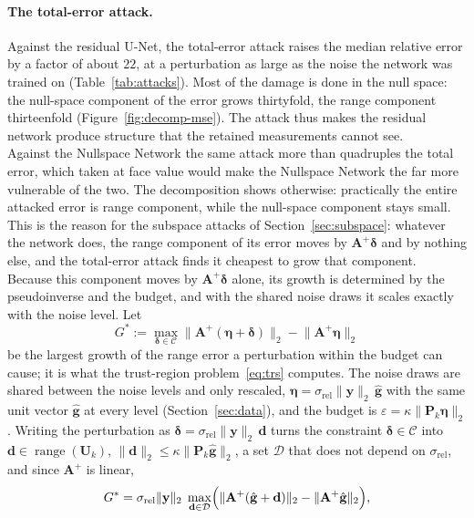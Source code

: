 \documentclass{article}
\numberwithin{equation}{section}
\begin{document}
\paragraph{The total-error attack.} Against the residual U-Net, the total-error attack raises the
median relative error by a factor of about $22$, at a perturbation as large as the noise the network
was trained on (Table~\ref{tab:attacks}). Most of the damage is done in the null space: the
null-space component of the error grows thirtyfold, the range component thirteenfold
(Figure~\ref{fig:decomp-mse}). The attack thus makes the residual network produce structure that
the retained measurements cannot see.\\
Against the Nullspace Network the same attack more than quadruples the total error, which taken at
face value would make the Nullspace Network the far more vulnerable of the two. The decomposition
shows otherwise: practically the entire attacked error is range component, while the null-space
component stays small. This is the reason for the subspace attacks of
Section~\ref{sec:subspace}: whatever the network does, the range component of its error moves by
$\mathbf{A}^{+}\boldsymbol{\delta}$ and by nothing else, and the total-error attack finds it cheapest to
grow that component.\\
Because this component moves by $\mathbf{A}^{+}\boldsymbol{\delta}$ alone, its growth is determined by the
pseudoinverse and the budget, and with the shared noise draws it scales exactly with the noise level.
Let
\[G^*:=\max_{\boldsymbol{\delta}\in\mathcal{C}}\lVert\mathbf{A}^{+}(\boldsymbol{\eta}+\boldsymbol{\delta})\rVert_2-\lVert\mathbf{A}^{+}\boldsymbol{\eta}\rVert_2\]
be the largest growth of the range error a perturbation within the budget can cause; it is what the
trust-region problem~\eqref{eq:trs} computes. The noise draws are shared between the noise levels and only
rescaled, $\boldsymbol{\eta}=\sigma_\text{rel}\lVert\mathbf{y}\rVert_2\,\hat{\mathbf{g}}$ with the same unit
vector $\hat{\mathbf{g}}$ at every level (Section~\ref{sec:data}), and the budget is
$\varepsilon=\kappa\lVert\mathbf{P}_k\boldsymbol{\eta}\rVert_2$. Writing the perturbation as
$\boldsymbol{\delta}=\sigma_\text{rel}\lVert\mathbf{y}\rVert_2\,\mathbf{d}$ turns the constraint
$\boldsymbol{\delta}\in\mathcal{C}$ into $\mathbf{d}\in\operatorname{range}(\mathbf{U}_k)$,
$\lVert\mathbf{d}\rVert_2\leq\kappa\lVert\mathbf{P}_k\hat{\mathbf{g}}\rVert_2$, a set $\mathcal{D}$ that does not depend
on $\sigma_\text{rel}$, and since $\mathbf{A}^{+}$ is linear,
\begin{equation}\label{eq:linear}
G^*=\sigma_\text{rel}\lVert\mathbf{y}\rVert_2\;\max_{\mathbf{d}\in\mathcal{D}}\Bigl(\lVert\mathbf{A}^{+}(\hat{\mathbf{g}}+\mathbf{d})\rVert_2-\lVert\mathbf{A}^{+}\hat{\mathbf{g}}\rVert_2\Bigr),
\end{equation}
\end{document}
